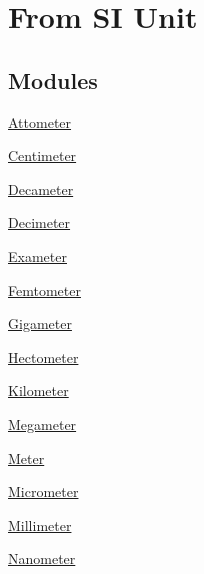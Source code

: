 \hypertarget{group___e_g_x_math-_conversions-_length_conversions-_s_i}{}\section{From SI Unit}
\label{group___e_g_x_math-_conversions-_length_conversions-_s_i}
\subsection*{Modules}
\begin{DoxyCompactItemize}
\item 
\mbox{\hyperlink{group___e_g_x_math-_conversions-_length_conversions-_s_i-_attometer}{Attometer}}
\item 
\mbox{\hyperlink{group___e_g_x_math-_conversions-_length_conversions-_s_i-_centimeter}{Centimeter}}
\item 
\mbox{\hyperlink{group___e_g_x_math-_conversions-_length_conversions-_s_i-_decameter}{Decameter}}
\item 
\mbox{\hyperlink{group___e_g_x_math-_conversions-_length_conversions-_s_i-_decimeter}{Decimeter}}
\item 
\mbox{\hyperlink{group___e_g_x_math-_conversions-_length_conversions-_s_i-_exameter}{Exameter}}
\item 
\mbox{\hyperlink{group___e_g_x_math-_conversions-_length_conversions-_s_i-_femtometer}{Femtometer}}
\item 
\mbox{\hyperlink{group___e_g_x_math-_conversions-_length_conversions-_s_i-_gigameter}{Gigameter}}
\item 
\mbox{\hyperlink{group___e_g_x_math-_conversions-_length_conversions-_s_i-_hectometer}{Hectometer}}
\item 
\mbox{\hyperlink{group___e_g_x_math-_conversions-_length_conversions-_s_i-_kilometer}{Kilometer}}
\item 
\mbox{\hyperlink{group___e_g_x_math-_conversions-_length_conversions-_s_i-_megameter}{Megameter}}
\item 
\mbox{\hyperlink{group___e_g_x_math-_conversions-_length_conversions-_s_i-_meter}{Meter}}
\item 
\mbox{\hyperlink{group___e_g_x_math-_conversions-_length_conversions-_s_i-_micrometer}{Micrometer}}
\item 
\mbox{\hyperlink{group___e_g_x_math-_conversions-_length_conversions-_s_i-_millimeter}{Millimeter}}
\item 
\mbox{\hyperlink{group___e_g_x_math-_conversions-_length_conversions-_s_i-_nanometer}{Nanometer}}

\end{DoxyCompactItemize}
